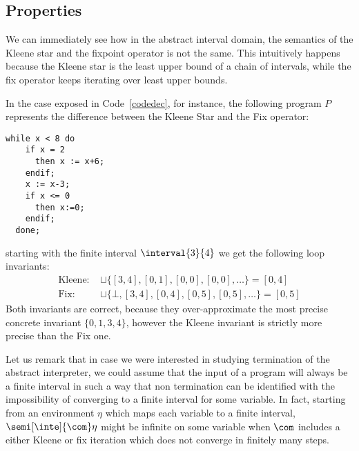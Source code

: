 \subsection{Properties}\label{sub:intervalsprop}

We can immediately see how in the abstract interval domain, the
semantics of the Kleene star and the fixpoint operator is not the
same. This intuitively happens because the Kleene star is the least
upper bound of a chain of intervals, while the fix operator keeps
iterating over least upper bounds.

\begin{example}\label{ex:fix} In the case exposed in
  Code~\ref{codedec}, for instance, the following program \(P\)
  represents the difference between the Kleene Star and the Fix
  operator:
  \begin{lstlisting}[caption=\(\fix{\com}\) and \(\com^*\) difference, label=codedec, language=Imp]
  while x < 8 do
    if x = 2
      then x := x+6;
    endif;
    x := x-3;
    if x <= 0
      then x:=0;
    endif;
  done;\end{lstlisting}
  starting with the finite interval \(\interval{3}{4}\) we get the
  following loop invariants:
  \begin{align*}
    \text{Kleene: } &\sqcup\{[3,4], [0,1], [0,0], [0,0], \ldots\} = [0,4]\\
    \text{Fix: } & \sqcup\{\bot, [3,4], [0,4], [0,5], [0,5],\ldots\} = [0,5]
  \end{align*}
  \noindent
  Both invariants are correct, because they over-approximate the most
  precise concrete invariant \(\{0,1,3,4\}\), however the Kleene
  invariant is strictly more precise than the Fix one.
\end{example}


\begin{remark}
  Let us remark that in case we were interested in studying
  termination of the abstract interpreter, we could assume that the
  input of a program will always be a finite interval in such a way
  that non termination can be identified with the impossibility of
  converging to a finite interval for some variable. In fact, starting
  from an environment \(\eta\) which maps each variable to a finite
  interval, \(\semi[\inte]{\com}\eta\) might be infinite on some variable
  when \(\com\) includes a either Kleene or fix iteration which does
  not converge in finitely many steps.
\end{remark}
